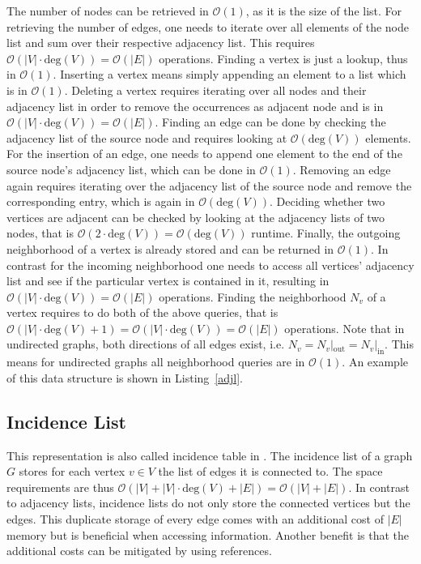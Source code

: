        The number of nodes can be retrieved in $\mathcal{O}(1)$, as it is the size of the list.
        For retrieving the number of edges, one needs to iterate over all elements of the node list and sum over their respective adjacency list. 
        This requires $\mathcal{O}(|V| \cdot \text{deg}(V)) = \mathcal{O}(|E|)$ operations.
        Finding a vertex is just a lookup, thus in $\mathcal{O}(1)$.
        Inserting a vertex means simply appending an element to a list which is in $\mathcal{O}(1)$.
        Deleting a vertex requires iterating over all nodes and their adjacency list in order to remove the occurrences as adjacent node and is in $\mathcal{O}(|V| \cdot \text{deg}(V)) = \mathcal{O}(|E|)$.
        Finding an edge can be done by checking the adjacency list of the source node and requires looking at $\mathcal{O}(\text{deg}(V))$ elements.
        For the insertion of an edge, one needs to append one element to the end of the source node's adjacency list, which can be done in $\mathcal{O}(1)$.
        Removing an edge again requires iterating over the adjacency list of the source node and remove the corresponding entry, which is again in $\mathcal{O}(\text{deg}(V))$.        
        Deciding whether two vertices are adjacent can be checked by looking at the adjacency lists of two nodes, that is $\mathcal{O}(2 \cdot \text{deg}(V)) = \mathcal{O}(\text{deg}(V))$ runtime.        
        Finally, the outgoing neighborhood of a vertex is already stored and can be returned in $\mathcal{O}(1)$.
        In contrast for the incoming neighborhood one needs to access all vertices' adjacency list and see if the particular vertex is contained in it, resulting in $\mathcal{O}(|V| \cdot \text{deg}(V)) = \mathcal{O}(|E|)$ operations.
        Finding the neighborhood $N_v$ of a vertex requires to do both of the above queries, that is $\mathcal{O}(|V| \cdot \text{deg}(V) + 1) = \mathcal{O}(|V| \cdot \text{deg}(V))  = \mathcal{O}(|E|)$ operations.  
        Note that in undirected graphs, both directions of all edges exist, i.e. $N_v = N_v |_\text{out} = N_v |_\text{in}$. This means for undirected graphs all neighborhood queries are in $\mathcal{O}(1)$.      
        An example of this data structure is shown in Listing~\ref{adjl}.
        
 
        
        \subsection{Incidence List}\label{inci}
            This representation is also called incidence table in \autocite{Gross1998GraphTA}.
            The incidence list of a graph $G$ stores for each vertex $v \in V$ the list of edges it is connected to. 
            The space requirements are thus $\mathcal{O}(|V| + |V| \cdot \text{deg}(V) + |E|) = \mathcal{O}(|V| + |E|)$. 
            In contrast to adjacency lists, incidence lists do not only store the connected vertices but the edges. 
            This duplicate storage of every edge comes with an additional cost of $|E|$ memory but is beneficial when accessing information. 
            Another benefit is that the additional costs can be mitigated by using references.
            
